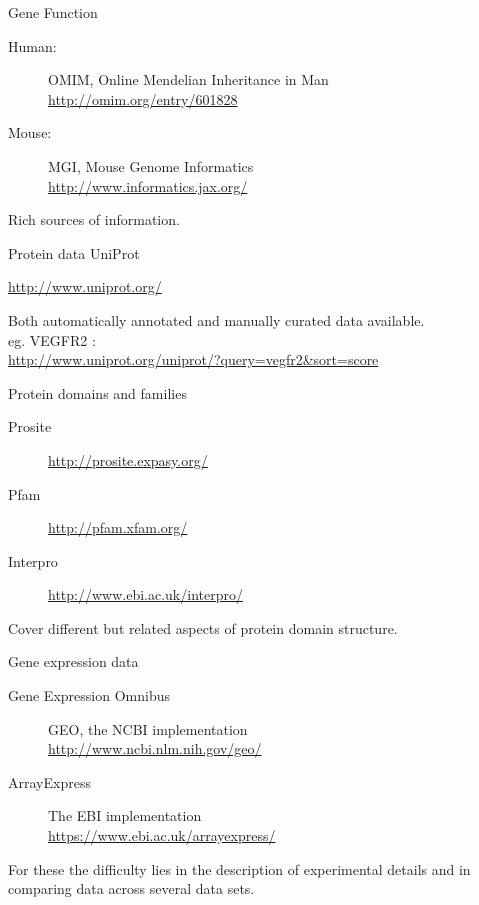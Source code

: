 \documentclass[pdf]{beamer}
\begin{document}
\begin{frame}{Gene Function}
  \begin{description}
    \item[Human:] OMIM, Online Mendelian Inheritance in Man\\
      \url{http://omim.org/entry/601828}\\
    \item[Mouse:] MGI, Mouse Genome Informatics\\
      \url{http://www.informatics.jax.org/}
  \end{description}
  
  Rich sources of information.
\end{frame}

\begin{frame}{Protein data}
  UniProt

  \url{http://www.uniprot.org/}

  Both automatically annotated and manually curated data available.\\
  \vspace{1ex}
  eg. VEGFR2 :\\
  {\small
  \url{http://www.uniprot.org/uniprot/?query=vegfr2&sort=score}
}
\end{frame}

\begin{frame}{Protein domains and families}
  \begin{description}
    \item[Prosite]
      \url{http://prosite.expasy.org/}  
    \item[Pfam]
      \url{http://pfam.xfam.org/}
    \item[Interpro]
      \url{http://www.ebi.ac.uk/interpro/}
  \end{description}

  Cover different but related aspects of protein domain structure.
\end{frame}

\begin{frame}{Gene expression data}
  \begin{description}
    \item[Gene Expression Omnibus] GEO, the NCBI implementation\\
      \url{http://www.ncbi.nlm.nih.gov/geo/}
    \item[ArrayExpress] The EBI implementation\\
      \url{https://www.ebi.ac.uk/arrayexpress/}
  \end{description}
  
  For these the difficulty lies in the description of experimental
  details and in comparing data across several data sets.
\end{frame}
\end{document}

